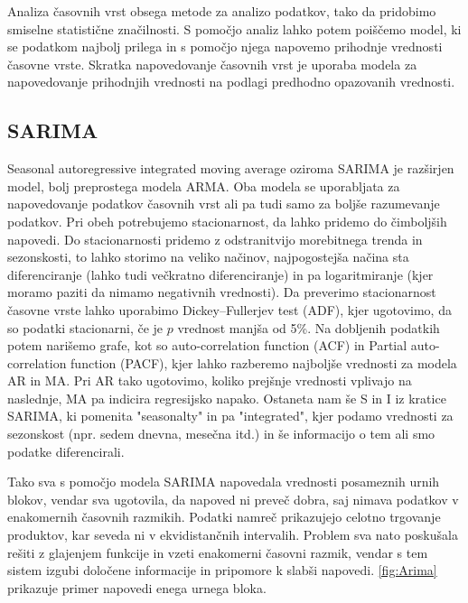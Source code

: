 \documentclass[12pt,a4paper]{amsart}
\theoremstyle{definition} %
\theoremstyle{plain} %
\begin{document}
Analiza časovnih vrst obsega metode za analizo podatkov, tako da pridobimo smiselne statistične značilnosti. S pomočjo analiz lahko potem poiščemo model, ki se podatkom najbolj prilega in s pomočjo njega napovemo prihodnje vrednosti časovne vrste.
Skratka napovedovanje časovnih vrst je uporaba modela za napovedovanje prihodnjih vrednosti na podlagi predhodno opazovanih vrednosti.

\subsection{SARIMA}

Seasonal autoregressive integrated moving average oziroma SARIMA je razširjen model, bolj preprostega modela ARMA. Oba modela se uporabljata za napovedovanje podatkov časovnih vrst ali pa tudi samo za boljše razumevanje podatkov. Pri obeh potrebujemo stacionarnost, da lahko pridemo do čimboljših napovedi. 
Do stacionarnosti pridemo z odstranitvijo morebitnega trenda in sezonskosti, to lahko storimo na veliko načinov, najpogostejša načina sta diferenciranje (lahko tudi večkratno diferenciranje) in pa logaritmiranje (kjer moramo paziti da nimamo negativnih vrednosti).
Da preverimo stacionarnost časovne vrste lahko uporabimo Dickey–Fullerjev test (ADF), kjer ugotovimo, da so podatki stacionarni, če je $p$ vrednost manjša od 5\%. Na dobljenih podatkih potem narišemo grafe, kot so auto-correlation function (ACF) in Partial auto-correlation function (PACF), kjer lahko razberemo najboljše vrednosti 
za modela AR in MA. Pri AR tako ugotovimo, koliko prejšnje vrednosti vplivajo na naslednje, MA pa indicira regresijsko napako. Ostaneta nam še S in I iz kratice SARIMA, ki pomenita "seasonalty" in pa "integrated", kjer podamo vrednosti za sezonskost (npr. sedem dnevna, mesečna itd.) in še informacijo o tem ali smo podatke diferencirali.


Tako sva s pomočjo modela SARIMA napovedala vrednosti posameznih urnih blokov, vendar sva ugotovila, da napoved ni preveč dobra, saj nimava podatkov v enakomernih časovnih razmikih. Podatki namreč prikazujejo celotno trgovanje produktov, kar seveda ni v ekvidistančnih intervalih. 
Problem sva nato poskušala rešiti z glajenjem funkcije in vzeti enakomerni časovni razmik, vendar s tem sistem izgubi določene informacije in pripomore k slabši napovedi.
\ref{fig:Arima} prikazuje primer napovedi enega urnega bloka.
\end{document}
